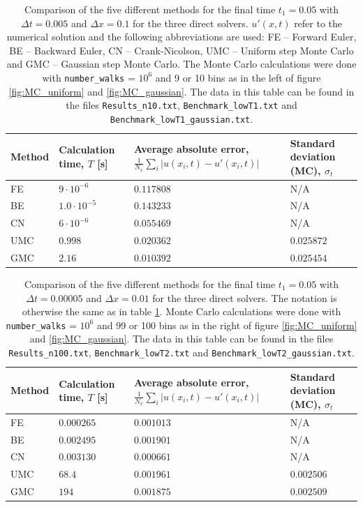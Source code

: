 \documentclass[a4paper, 11pt, notitlepage,english]{article}
\begin{document}
\begin{table}[h!tb]
\begin{center}
\caption{Comparison of the five different methods for the final time $t_1 = 0.05$ with $\Delta t = 0.005$ and $\Delta x=0.1$ for the three direct solvers. $u'(x,t)$ refer to the numerical solution and the following abbreviations are used: FE – Forward Euler, BE – Backward Euler, CN – Crank-Nicolson, UMC – Uniform step Monte Carlo and GMC – Gaussian step Monte Carlo. The Monte Carlo calculations were done with \texttt{number\_walks} = $10^{6}$ and 9 or 10 bins as in the left of figure \ref{fig:MC_uniform} and \ref{fig:MC_gaussian}. The data in this table can be found in the files \texttt{Results\_n10.txt}, \texttt{Benchmark\_lowT1.txt} and \texttt{Benchmark\_lowT1\_gaussian.txt}.} 
\begin{tabular}{p{2cm} p{2cm} p{4cm} p{2.5cm}}
\toprule
Method & Calculation time, $T$ [s] & Average absolute error, $\frac{1}{N_x}\sum_i\lvert u(x_i,t) - u'(x_i,t) \rvert$ & Standard deviation (MC), $\sigma_t$ \\ \midrule
FE & $9\cdot 10^{-6}$ & $0.117808$ & N/A \\
BE & $1.0\cdot 10^{-5}$ & $0.143233$ & N/A \\
CN & $6\cdot 10^{-6}$ & $0.055469$ & N/A \\
UMC & $0.998$ & $0.020362$ & $0.025872$ \\
GMC & $2.16$ & $0.010392$ & $0.025454$ \\
\bottomrule
\end{tabular}
\label{tab:Benchmark1}
\end{center}
\end{table}

\begin{table}[h!tb]
\begin{center}
\caption{Comparison of the five different methods for the final time $t_1 = 0.05$ with $\Delta t = 0.00005$ and $\Delta x=0.01$ for the three direct solvers. The notation is otherwise the same as in table \ref{tab:Benchmark1}. Monte Carlo calculations were done with \texttt{number\_walks} = $10^{6}$ and 99 or 100 bins as in the right of figure \ref{fig:MC_uniform} and \ref{fig:MC_gaussian}. The data in this table can be found in the files \texttt{Results\_n100.txt}, \texttt{Benchmark\_lowT2.txt} and \texttt{Benchmark\_lowT2\_gaussian.txt}.} 
\begin{tabular}{p{2cm} p{2cm} p{4cm} p{2.5cm}}
\toprule
Method & Calculation time, $T$ [s] & Average absolute error, $\frac{1}{N_x}\sum_i\lvert u(x_i,t) - u'(x_i,t) \rvert$ & Standard deviation (MC), $\sigma_t$ \\ \midrule
FE & $0.000265$ & $0.001013$ & N/A \\
BE & $0.002495$ & $0.001901$ & N/A \\
CN & $0.003130$ & $0.000661$ & N/A \\
UMC & $68.4$ & $0.001961$ & $0.002506$ \\
GMC & $194$ & $0.001875$ & $0.002509$ \\
\bottomrule
\end{tabular}
\label{tab:Benchmark2}
\end{center}
\end{table}
\end{document}
